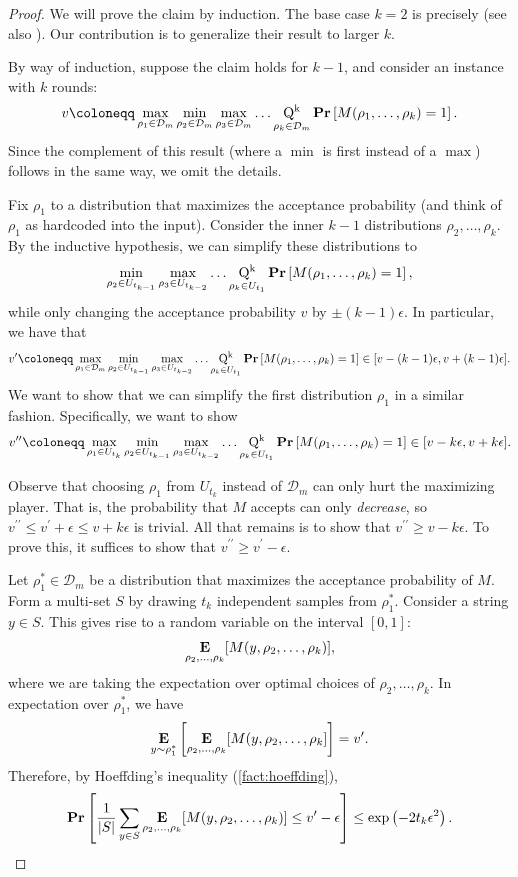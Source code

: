 \documentclass[10pt,a4paper]{article}
\newcommand{\eps}{\epsilon}
\theoremstyle{definition}
\renewcommand{\Pr}{\mathop{\bf Pr\/}}
\newcommand{\E}{\mathop{\bf E\/}}
\newcommand{\calD}{\mathcal{D}}
\newcommand{\abs}[1]{\left\lvert #1 \right\rvert}
\begin{document}
\begin{proof}
We will prove the claim by induction. The base case $k=2$ is precisely \cite[Theorem 2]{lipton1994simple} (see also \cite{ALTHOFER1994339}). Our contribution is to generalize their result to larger $k$. 


    By way of induction, suppose the claim holds for $k-1$, and consider an instance with $k$ rounds:
    \[
        v \coloneqq \max_{\rho_1 \in\calD_m} \min_{\rho_2 \in\calD_m} \max_{\rho_3 \in\calD_m} \dots \operatorname*{Q^k}_{\rho_{k} \in\calD_m} \Pr\left[M(\rho_1,\dots,\rho_k) = 1\right].
    \]
   Since the complement of this result (where a $\min$ is first instead of a $\max$) follows in the same way, we omit the details.
    
    Fix $\rho_1$ to a distribution that maximizes the acceptance probability (and think of $\rho_1$ as hardcoded into the input). 
    Consider the inner $k-1$ distributions $\rho_2, \ldots, \rho_k$. By the inductive hypothesis, we can simplify these distributions to 
    \[
   \min_{\rho_2 \in U_{t_{k-1}}} \max_{\rho_3 \in U_{t_{k-2}}} \dots \operatorname*{Q^k}_{\rho_{k} \in U_{t_1}} \Pr\left[M(\rho_1,\dots,\rho_k) = 1\right], 
    \]
    while only changing the acceptance probability $v$ by $\pm (k-1)\eps$. 
    In particular, we have that 
    \[
        v^\prime \coloneqq \max_{\rho_1 \in\calD_m} \min_{\rho_2 \in U_{t_{k-1}}} \max_{\rho_3 \in U_{t_{k-2}}} \dots \operatorname*{Q^k}_{\rho_{k} \in U_{t_1}} \Pr\left[M(\rho_1,\dots,\rho_k) = 1\right] \in [v - (k-1) \eps, v + (k-1)\eps]. 
    \]
    We want to show that we can simplify the first distribution $\rho_1$ in a similar fashion. Specifically, we want to show 
    \[
     v^{\prime\prime} \coloneqq  \max_{\rho_1 \in U_{t_k}} \min_{\rho_2 \in U_{t_{k-1}}} \max_{\rho_3 \in U_{t_{k-2}}} \dots \operatorname*{Q^k}_{\rho_{k} \in U_{t_1}} \Pr\left[M(\rho_1,\dots,\rho_k) = 1\right] \in [v - k \eps, v + k\eps]. 
    \]
    
    Observe that choosing $\rho_1$ from $U_{t_k}$ instead of $\calD_m$ can only hurt the maximizing player. That is, the probability that $M$ accepts can only \emph{decrease}, so $v^{\prime\prime} \leq v^\prime + \eps \leq v + k\eps$ is trivial. 
    All that remains is to show that $v^{\prime\prime} \geq v - k\eps$. 
    To prove this, it suffices to show that $v^{\prime\prime} \geq v^\prime - \eps$.
    
    Let $\rho_1^* \in \calD_m$ be a distribution that maximizes the acceptance probability of $M$. 
    Form a multi-set $S$ by drawing $t_k$ independent samples from $\rho_1^*$.
    Consider a string $y \in S$. This gives rise to a random variable on the interval $[0,1]$: 
    \[
    \E_{\rho_2, \ldots, \rho_k}[M(y, \rho_2, \ldots, \rho_k)], 
    \]
    where we are taking the expectation over optimal choices of $\rho_2, \ldots, \rho_k$.
    In expectation over $\rho_1^*$, we have 
    \[
    \E_{y \sim \rho_1^*}\left[ 
    \E_{\rho_2, \ldots, \rho_k}[M(y, \rho_2, \ldots, \rho_k]\right] = v^\prime.
    \]
    Therefore, by Hoeffding's inequality (\cref{fact:hoeffding}), 
    \[
    \Pr\left[ \frac{1}{\abs{S}} \sum_{y \in S} \E_{\rho_2, \ldots, \rho_k}[M(y, \rho_2, \ldots, \rho_k)] \leq v^\prime - \eps \right] \leq \exp\left(-2 t_k \eps^2\right).
    \]
    

\end{proof}
\end{document}
